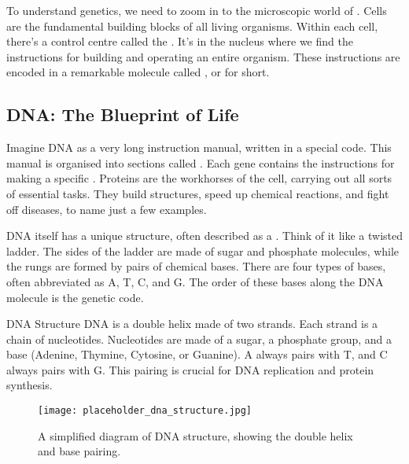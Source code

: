 To understand genetics, we need to zoom in to the microscopic world of . Cells are the fundamental building blocks of all living organisms.  Within each cell, there's a control centre called the .  It's in the nucleus where we find the instructions for building and operating an entire organism. These instructions are encoded in a remarkable molecule called , or  for short.

\subsection{DNA: The Blueprint of Life}

Imagine DNA as a very long instruction manual, written in a special code. This manual is organised into sections called . Each gene contains the instructions for making a specific . Proteins are the workhorses of the cell, carrying out all sorts of essential tasks.  They build structures, speed up chemical reactions, and fight off diseases, to name just a few examples.

DNA itself has a unique structure, often described as a .  Think of it like a twisted ladder.  The sides of the ladder are made of sugar and phosphate molecules, while the rungs are formed by pairs of chemical bases. There are four types of bases, often abbreviated as A, T, C, and G.  The order of these bases along the DNA molecule is the genetic code.

\begin{marginnote}
\end{marginnote}

\begin{keyconcept}{DNA Structure}
DNA is a double helix made of two strands. Each strand is a chain of nucleotides.  Nucleotides are made of a sugar, a phosphate group, and a base (Adenine, Thymine, Cytosine, or Guanine).  A always pairs with T, and C always pairs with G. This pairing is crucial for DNA replication and protein synthesis.
\end{keyconcept}

\begin{figure}[htbp]
\centering
\texttt{[image: placeholder\_dna\_structure.jpg]}
\caption{A simplified diagram of DNA structure, showing the double helix and base pairing.}
\end{figure}

